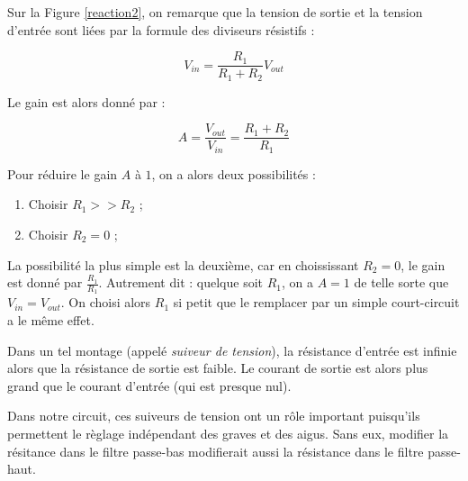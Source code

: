 Sur la Figure \ref{reaction2}, on remarque que la tension de sortie et la tension d'entrée sont liées 
par la formule des diviseurs résistifs :

$$V_{in} = \frac{R_1}{R_1 + R_2} V_{out}$$

Le gain est alors donné par :

$$A = \frac{V_{out}}{V_{in}} = \frac{R_1 + R_2}{R_1}$$

Pour réduire le gain $A$ à $1$, on a alors deux possibilités :

\begin{enumerate}
	\item	Choisir $R_1 >> R_2$ ;
	\item Choisir $R_2 = 0$ ;
\end{enumerate}

La possibilité la plus simple est la deuxième, car en choississant $R_2 = 0$, le gain est donné par $\frac{R_1}{R_1}$. 
Autrement dit : quelque soit $R_1$, on a $A = 1$ de telle sorte que $V_{in} = V_{out}$. On choisi alors $R_1$ si petit 
que le remplacer par un simple court-circuit a le même effet.

Dans un tel montage (appelé \textit{suiveur de tension}), la résistance d'entrée est infinie alors que la résistance de 
sortie est faible. Le courant de sortie est alors plus grand que le courant d'entrée (qui est presque nul).

Dans notre circuit, ces suiveurs de tension ont un rôle important puisqu'ils permettent le règlage indépendant des
graves et des aigus. Sans eux, modifier la résitance dans le filtre passe-bas modifierait aussi la résistance dans
le filtre passe-haut.

